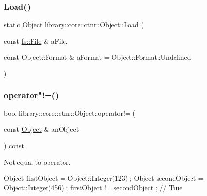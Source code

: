 \mbox{\label{classlibrary_1_1core_1_1ctnr_1_1Object_a508e658f6525f7607a7fa869c3ac4df5}} 
\subsubsection{\texorpdfstring{Load()}{Load()}}
{\footnotesize\ttfamily static \hyperlink{classlibrary_1_1core_1_1ctnr_1_1Object}{Object} library\+::core\+::ctnr\+::\+Object\+::\+Load (\begin{DoxyParamCaption}\item[{const \hyperlink{classlibrary_1_1core_1_1fs_1_1File}{fs\+::\+File} \&}]{a\+File,  }\item[{const \hyperlink{classlibrary_1_1core_1_1ctnr_1_1Object_a7bf8961c4ef65f691aa2993ec405c647}{Object\+::\+Format} \&}]{a\+Format = {\ttfamily \hyperlink{classlibrary_1_1core_1_1ctnr_1_1Object_a7bf8961c4ef65f691aa2993ec405c647aec0fc0100c4fc1ce4eea230c3dc10360}{Object\+::\+Format\+::\+Undefined}} }\end{DoxyParamCaption})\hspace{0.3cm}{\ttfamily [static]}}

\mbox{\label{classlibrary_1_1core_1_1ctnr_1_1Object_a8544bc0fbc6db8b12c8dabd51b075aa5}} 
\subsubsection{\texorpdfstring{operator"!=()}{operator!=()}}
{\footnotesize\ttfamily bool library\+::core\+::ctnr\+::\+Object\+::operator!= (\begin{DoxyParamCaption}\item[{const \hyperlink{classlibrary_1_1core_1_1ctnr_1_1Object}{Object} \&}]{an\+Object }\end{DoxyParamCaption}) const}



Not equal to operator. 


\begin{DoxyCode}
\hyperlink{classlibrary_1_1core_1_1ctnr_1_1Object_a51bb72dec3a1b2738e0ad92b977b8d8d}{Object} firstObject = \hyperlink{classlibrary_1_1core_1_1ctnr_1_1Object_a6746a69f0507b2c7ad8ebdf3d873b083}{Object::Integer}(123) ;
\hyperlink{classlibrary_1_1core_1_1ctnr_1_1Object_a51bb72dec3a1b2738e0ad92b977b8d8d}{Object} secondObject = \hyperlink{classlibrary_1_1core_1_1ctnr_1_1Object_a6746a69f0507b2c7ad8ebdf3d873b083}{Object::Integer}(456) ;
firstObject != secondObject ; \textcolor{comment}{// True}
\end{DoxyCode}



